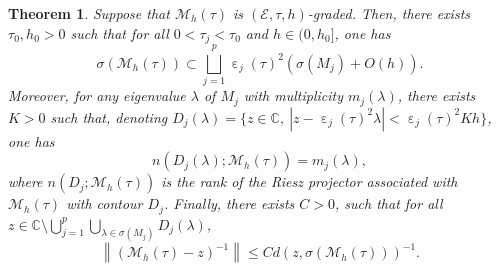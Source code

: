 \documentclass[12pt]{amsart}
\newcommand{\C}{\mathbb C}
\numberwithin{equation}{section}
\numberwithin{figure}{section}
\DeclareMathOperator{\eps}{\varepsilon}
\newcommand{\vvert}[1]{\left\lVert#1\right\rVert}
\newtheorem{theorem}{Theorem}
\def\mmm{{\mathcal M}}\def\nnn{{\mathcal N}} \def\ooo{{\mathcal O}}\def\ppp{{\mathcal P}}
\def\Er{{\mathscr E}}\def\Fr{{\mathscr F}}\def\Gr{{\mathscr G}}\def\Hr{{\mathscr H}}
\begin{document}
\begin{theorem}\cite[Theorem A.4]{LePMi20}\label{thm:graded}
    Suppose that $\mmm_h(\tau)$ is $(\Er,\tau,h)$-graded. Then, there exists $\tau_0, h_0>0$ such that for all $0<\tau_j<\tau_0$ and $h\in(0,h_0]$, one has
    \begin{equation*}
    \sigma(\mmm_h(\tau))\subset\bigsqcup_{j=1}^p\eps_j(\tau)^2(\sigma(M_j) + O(h)).
    \end{equation*}
    Moreover, for any eigenvalue $\lambda$ of $M_j$ with multiplicity $m_j(\lambda)$, there exists $K>0$ such that, denoting $D_j(\lambda) = \{z\in\C,\ |z-\eps_j(\tau)^2\lambda| < \eps_j(\tau)^2Kh\}$, one has
    \begin{equation*}
    n(D_j(\lambda);\mmm_h(\tau)) = m_j(\lambda),
    \end{equation*}
    where $n(D_j;\mmm_h(\tau))$ is the rank of the Riesz projector associated with $\mmm_h(\tau)$ with contour $D_j$. Finally, there exists $C>0$, such that for all $z\in\C\setminus\bigcup_{j=1}^p\bigcup_{\lambda\in\sigma(M_j)}D_j(\lambda)$,
    \begin{equation}\label{eq:resolventGraded}
    \vvert{(\mmm_h(\tau) - z)^{-1}} \leq Cd(z,\sigma(\mmm_h(\tau)))^{-1}.
    \end{equation}
\end{theorem}
\end{document}
